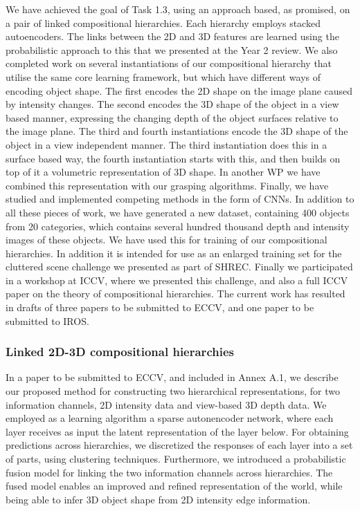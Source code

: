 \documentclass[a4paper,11pt,pdf]{../templates/pacmanreport}
\begin{document}
We have achieved the goal of Task 1.3, using an approach based, as promised, on a pair of linked compositional hierarchies. Each hierarchy employs stacked autoencoders. The links between the 2D and 3D features are learned using the probabilistic approach to this that we presented at the Year 2 review. We also completed work on several instantiations of our compositional hierarchy that utilise the same core learning framework, but which have different ways of encoding object shape. The first encodes the 2D shape on the image plane caused by intensity changes. The second encodes the 3D shape of the object in a view based manner, expressing the changing depth of the object surfaces relative to the image plane. The third and fourth instantiations encode the 3D shape of the object in a view independent manner. The third instantiation does this in a surface based way, the fourth instantiation starts with this, and then builds on top of it a volumetric representation of 3D shape. In another WP we have combined this representation with our grasping algorithms. Finally, we have studied and implemented competing methods in the form of CNNs. In addition to all these pieces of work, we have generated a new dataset, containing 400 objects from 20 categories, which contains several hundred thousand depth and intensity images of these objects. We have used this for training of our compositional hierarchies. In addition it is intended for use as an enlarged training set for the cluttered scene challenge we presented as part of SHREC. Finally we participated in a workshop at ICCV, where we presented this challenge, and also a full ICCV paper on the theory of compositional hierarchies. The current work has resulted in drafts of three papers to be submitted to ECCV, and one paper to be submitted to IROS.

\subsubsection{Linked 2D-3D compositional hierarchies}

In a paper to be submitted to ECCV, and included in Annex A.1, we describe our proposed method for constructing two hierarchical representations, for two information channels, 2D intensity data and view-based 3D depth data. We employed as a learning algorithm a sparse autonencoder network, where each layer receives as input the latent representation of the layer below. For obtaining predictions across hierarchies, we discretized the responses of each layer into a set of parts, using clustering techniques. Furthermore, we introduced a probabilistic fusion model for linking the two information channels across hierarchies. The fused model enables an improved and refined representation of the world, while being able to infer 3D object shape from 2D intensity edge information.
\end{document}
